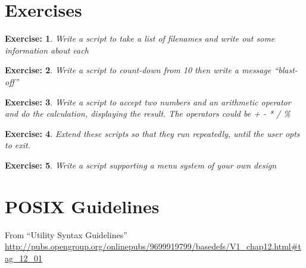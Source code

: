 \documentclass{article}
\newtheorem{exercise}{Exercise:}
\begin{document}
\section{Exercises}
\begin{exercise}
  Write a script to take a list of filenames and write out some
  information about each
\end{exercise}

\begin{exercise}
Write a script to count-down from
10 then write a message ``blast-off''
\end{exercise}

\begin{exercise}
  Write a script to accept two numbers and an arithmetic operator and
  do the calculation, displaying the result. The operators could be +
  - * / \%
\end{exercise}

\begin{exercise}
  Extend these scripts so that they run repeatedly, until the user
  opts to exit.
\end{exercise}

\begin{exercise}
  Write a script supporting a menu system of your own design
\end{exercise}


\clearpage\appendix
\section{POSIX Guidelines}
From ``Utility Syntax Guidelines''
\url{http://pubs.opengroup.org/onlinepubs/9699919799/basedefs/V1_chap12.html#tag_12_01}
\end{document}
